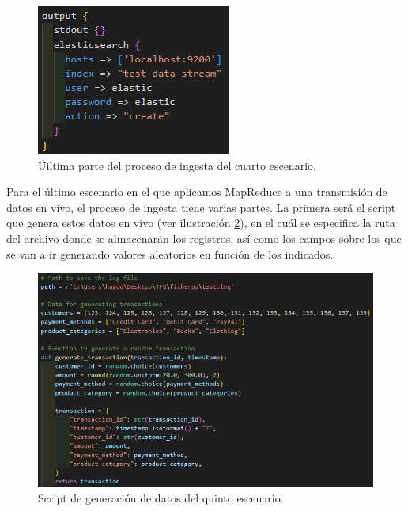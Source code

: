 \begin{figure}
    \centering
    \includegraphics[width=1\linewidth]{img/ingesta43.png}
    \caption{Úiltima parte del proceso de ingesta del cuarto escenario.}
    \label{fig:ingesta43}
\end{figure}

Para el último escenario en el que aplicamos MapReduce a una transmisión de datos en vivo, el proceso de ingesta tiene varias partes. La primera será el script que genera estos datos en vivo  (ver ilustración  \ref{fig:ingesta51}), en el cuál se especifica la ruta del archivo donde se almacenarán los registros, así como los campos sobre los que se van a ir generando valores aleatorios en función de los indicados. 

\begin{figure}
    \centering
    \includegraphics[width=1\linewidth]{img/ingesta51.png}
    \caption{Script de generación de datos del quinto escenario.}
    \label{fig:ingesta51}
\end{figure}

